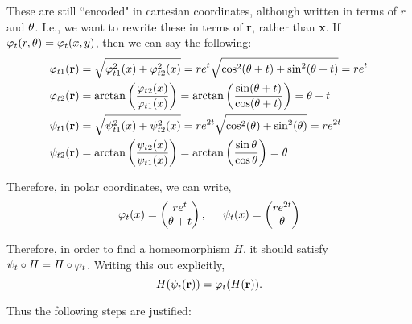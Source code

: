 \begin{solution}
    These are still ``encoded" in cartesian coordinates, although written in terms of $r$ and $\theta$. I.e., we want to rewrite these in terms of \textbf{r}, rather than \textbf{x}. If $\varphi_t(r, \theta) = \varphi_t(x, y)$, then we can say the following:
    \begin{align}
        \varphi_{t1}(\textbf{r}) &= \sqrt{\varphi_{t1}^2(x) + \varphi_{t2}^2(x)} = re^t\sqrt{\cos^2(\theta + t) + \sin^2(\theta + t)} = re^t \nonumber\\
        \varphi_{t2}(\textbf{r}) &= \arctan\bigg( \frac{\varphi_{t2}(x)}{\varphi_{t1}(x)} \bigg) = \arctan\bigg( \frac{\sin(\theta + t)}{\cos (\theta + t)} \bigg) = \theta + t\nonumber\\
        \psi_{t1}(\textbf{r}) &= \sqrt{\psi_{t1}^2(x) + \psi_{t2}^2(x)} = re^{2t}\sqrt{\cos^2(\theta) + \sin^2(\theta)} = re^{2t}\nonumber\\
        \psi_{t2}(\textbf{r}) &= \arctan\bigg( \frac{\psi_{t2}(x)}{\psi_{t1}(x)} \bigg) = \arctan\bigg( \frac{\sin\theta}{\cos \theta} \bigg) = \theta 
    \end{align}


    Therefore, in polar coordinates, we can write,
    \alignbreak
    \begin{align}
            \varphi_t(x)  =  
        \begin{pmatrix}
            re^t\\
            \theta + t
        \end{pmatrix}
        ,
        \hspace{5mm}
    \psi_t(x)   =   
        \begin{pmatrix}
            re^{2t}\\
            \theta
        \end{pmatrix}\nonumber
    \end{align}
    \alignbreak

    \newpage
    Therefore, in order to find a homeomorphism $H$, it should satisfy $\psi_t \circ H = H \circ \varphi_t$. Writing this out explicitly, 
    \[
    H(\psi_t(\textbf{r})) = \varphi_t(H(\textbf{r})).
    \]

    Thus the following steps are justified:


\end{solution}
